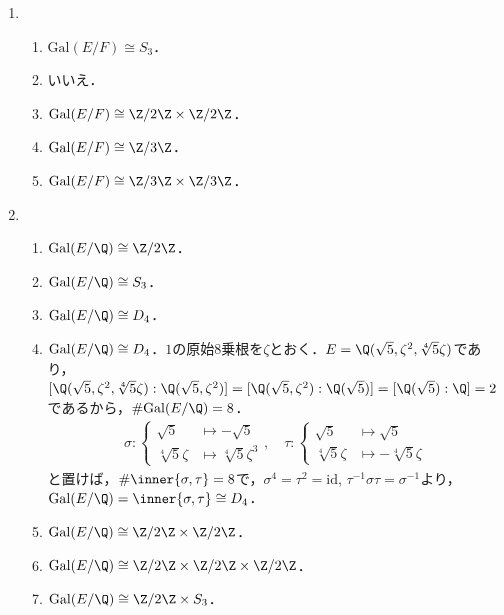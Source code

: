 \documentclass[a4paper,10pt]{ltjsarticle}
\newcommand{\gal}{\mathrm{Gal}}
\begin{document}
\begin{enumerate}
  \item \label{enshu:2.1} \
  \begin{enumerate}
    \item \label{enshu:2.1.1} $\gal(E/F) \cong S_3$．
    \item \label{enshu:2.1.2} いいえ．
    \item \label{enshu:2.1.3} $\gal(E/F) \cong \Z/2\Z \times \Z/2\Z$．
    \item \label{enshu:2.1.4} $\gal(E/F) \cong \Z/3\Z$．
    \item \label{enshu:2.1.5} $\gal(E/F) \cong \Z/3\Z\times\Z/3\Z$．
  \end{enumerate}
  \item \label{enshu:2.2} \
  \begin{enumerate}
    \item \label{enshu:2.2.1} $\gal(E/\Q) \cong \Z/2\Z$．
    \item \label{enshu:2.2.2} $\gal(E/\Q) \cong S_3$．
    \item \label{enshu:2.2.3} $\gal(E/\Q) \cong D_4$．
    \item \label{enshu:2.2.4} $\gal(E/\Q) \cong D_4$．$1$の原始$8$乗根を$\zeta$とおく．$E = \Q(\sqrt5, \zeta^2, \sqrt[4]{5}\zeta)$であり，$[\Q(\sqrt5, \zeta^2, \sqrt[4]{5}\zeta) : \Q(\sqrt{5}, \zeta^2)] = [\Q(\sqrt5, \zeta^2) : \Q(\sqrt5)] = [\Q(\sqrt5) : \Q] = 2$であるから，$\#\gal(E/\Q) = 8$．
    \begin{align*}
      \sigma : \begin{cases}
        \sqrt5 &\mapsto -\sqrt5 \\
        \sqrt[4]{5}\zeta &\mapsto \sqrt[4]{5}\zeta^3
      \end{cases}
      , \quad \tau : \begin{cases}
        \sqrt5 &\mapsto \sqrt5 \\
        \sqrt[4]{5}\zeta &\mapsto -\sqrt[4]{5}\zeta
      \end{cases}
    \end{align*}
    と置けば，$\#\inner{\sigma, \tau} = 8$で，$\sigma^4 = \tau^2 = \mathrm{id}$, $\tau^{-1}\sigma\tau = \sigma^{-1}$より，$\gal(E/\Q) = \inner{\sigma, \tau} \cong D_4$．
    \item \label{enshu:2.2.5} $\gal(E/\Q) \cong \Z/2\Z \times \Z/2\Z$．
    \item \label{enshu:2.2.6} $\gal(E/\Q) \cong \Z/2\Z \times \Z/2\Z \times \Z/2\Z$．
    \item \label{enshu:2.2.7} $\gal(E/\Q) \cong \Z/2\Z \times S_3$．

\end{enumerate}
\end{enumerate}
\end{document}

